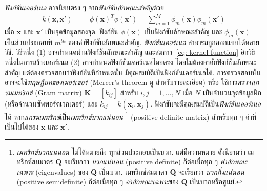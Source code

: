 \textit{ฟังก์ชันเคอร์เนล} อาจนิยมตรง ๆ จาก\textit{ฟังก์ชันลักษณะสำคัญ}ด้วย
\begin{eqnarray}
k(\bm{x}, \bm{x}') &=& \phi(\bm{x})^T \phi(\bm{x}') = \sum_{m=1}^M \phi_m(\bm{x}) \phi_m(\bm{x}')
\label{eq: kernel function}
\end{eqnarray}
เมื่อ $\bm{x}$ และ $\bm{x}'$ เป็นจุดข้อมูลสองจุด.
ฟังก์ชัน $\phi(\bm{x})$ เป็นฟังก์ชันลักษณะสำคัญ 
และ $\phi_m(\bm{x})$ เป็นส่วนประกอบที่ $m^{th}$ ของค่าฟังก์ชันลักษณะสำคัญ.
\textit{ฟังก์ชันเคอร์เนล} สามารถถูกออกแบบได้หลายวิธี.
วิธีหนึ่ง (1) อาจกำหนดผ่านฟังก์ชันลักษณะสำคัญ และสมการ~\ref{eq: kernel function}
อีกวิธีหนึ่งในการสร้างเคอร์เนล (2) อาจกำหนดฟังก์ชันเคอร์เนลโดยตรง โดยไม่ต้องอาศัยฟังก์ชันลักษณะสำคัญ
แต่ต้องตรวจสอบว่าฟังก์ชันที่กำหนดนั้น มีคุณสมบัติเป็นฟังก์ชันเคอร์เนลได้.
การตรวจสอบนั้น อาจจะใช้\textit{ทฤษฎีบทของเมอร์เซอร์} (Mercer's theorem ดู \cite{Haykin2009a} สำหรับรายละเอียด)
หรือ ใช้การตรวจ\textit{แกรมเมทริกซ์} (Gram matrix) $\bm{K} = [k_{ij}]$ สำหรับ $i,j = 1, \ldots, N$ เมื่อ $N$ เป็นจำนวนจุดข้อมูลฝึก (หรือจำนวนซัพพอร์ตเวกเตอร์)
และ $k_{ij} = k(\bm{x}_i, \bm{x}_j)$.
ฟังก์ชันจะมีคุณสมบัติเป็น\textit{ฟังก์ชันเคอร์เนล}ได้
หาก\textit{แกรมเมทริกซ์}เป็น\textit{เมทริกซ์บวกแน่นอน}%
\footnote{%
\textit{เมทริกซ์บวกแน่นอน} ไม่ได้หมายถึง ทุกส่วนประกอบเป็นบวก.
แต่มีความหมาย ดังนิยามว่า
เมทริกซ์สมมาตร $\bm{Q}$ จะเรียกว่า \textit{บวกแน่นอน} (positive definite) 
ก็ต่อเมื่อทุก ๆ \textit{ค่าลักษณะเฉพาะ} (eigenvalues) ของ $\bm{Q}$ เป็นบวก.
เมทริกซ์สมมาตร $\bm{Q}$ จะเรียกว่า \textit{บวกกึ่งแน่นอน} (positive semidefinite) 
ก็ต่อเมื่อทุก ๆ \textit{ค่าลักษณะเฉพาะ}ของ $\bm{Q}$ เป็นบวกหรือศูนย์.
}
(positive definite matrix) สำหรับทุก ๆ ค่าที่เป็นไปได้ของ $\bm{x}$ และ $\bm{x}'$.

